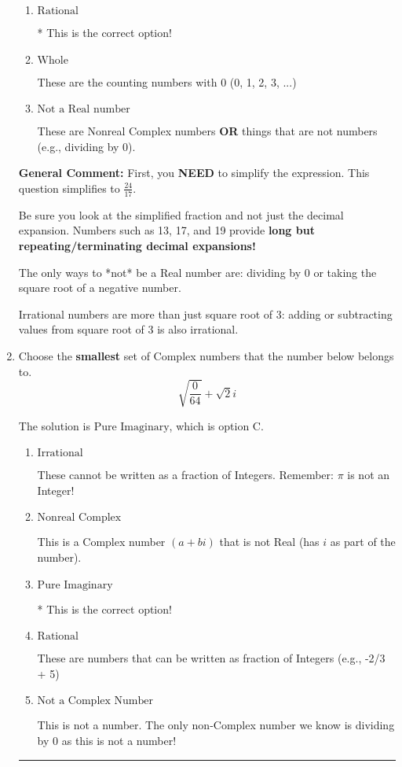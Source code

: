 \documentclass{extbook}[14pt]
\newcommand{\litem}[1]{\item #1

\rule{\textwidth}{0.4pt}}
\begin{document}
\begin{enumerate}
{\begin{enumerate}[label=\Alph*.]
These cannot be written as a fraction of Integers.
\item \( \text{Rational} \)

* This is the correct option!
\item \( \text{Whole} \)

These are the counting numbers with 0 (0, 1, 2, 3, ...)
\item \( \text{Not a Real number} \)

These are Nonreal Complex numbers \textbf{OR} things that are not numbers (e.g., dividing by 0).
\end{enumerate}

\textbf{General Comment:} First, you \textbf{NEED} to simplify the expression. This question simplifies to $\frac{24}{17}$. 
 
 Be sure you look at the simplified fraction and not just the decimal expansion. Numbers such as 13, 17, and 19 provide \textbf{long but repeating/terminating decimal expansions!} 
 
 The only ways to *not* be a Real number are: dividing by 0 or taking the square root of a negative number. 
 
 Irrational numbers are more than just square root of 3: adding or subtracting values from square root of 3 is also irrational.
}
\litem{
Choose the \textbf{smallest} set of Complex numbers that the number below belongs to.
\[ \sqrt{\frac{0}{64}}+\sqrt{2}i \]

The solution is \( \text{Pure Imaginary} \), which is option C.\begin{enumerate}[label=\Alph*.]
\item \( \text{Irrational} \)

These cannot be written as a fraction of Integers. Remember: $\pi$ is not an Integer!
\item \( \text{Nonreal Complex} \)

This is a Complex number $(a+bi)$ that is not Real (has $i$ as part of the number).
\item \( \text{Pure Imaginary} \)

* This is the correct option!
\item \( \text{Rational} \)

These are numbers that can be written as fraction of Integers (e.g., -2/3 + 5)
\item \( \text{Not a Complex Number} \)

This is not a number. The only non-Complex number we know is dividing by 0 as this is not a number!
\end{enumerate}

}
\end{enumerate}
\end{document}
